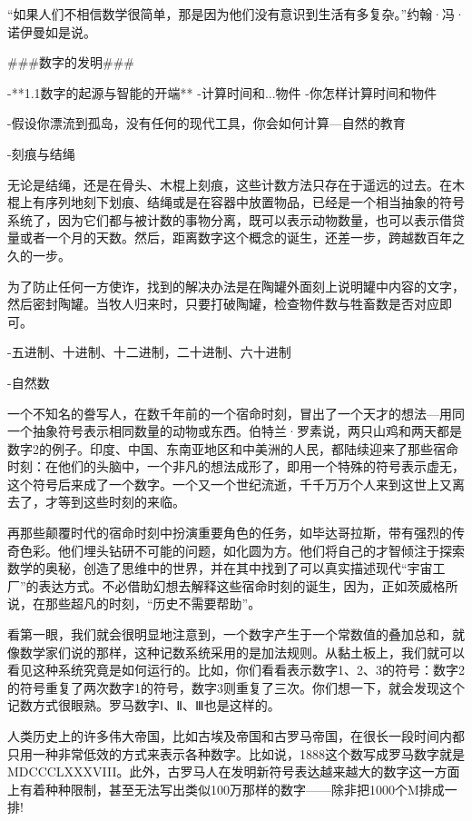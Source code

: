 “如果人们不相信数学很简单，那是因为他们没有意识到生活有多复杂。”约翰·冯·诺伊曼如是说。


###数字的发明###

-**1.1数字的起源与智能的开端**
-计算时间和...物件
-你怎样计算时间和物件

-假设你漂流到孤岛，没有任何的现代工具，你会如何计算---自然的教育

-刻痕与结绳

无论是结绳，还是在骨头、木棍上刻痕，这些计数方法只存在于遥远的过去。在木棍上有序列地刻下划痕、结绳或是在容器中放置物品，已经是一个相当抽象的符号系统了，因为它们都与被计数的事物分离，既可以表示动物数量，也可以表示借贷量或者一个月的天数。然后，距离数字这个概念的诞生，还差一步，跨越数百年之久的一步。

为了防止任何一方使诈，找到的解决办法是在陶罐外面刻上说明罐中内容的文字，然后密封陶罐。当牧人归来时，只要打破陶罐，检查物件数与牲畜数是否对应即可。


-五进制、十进制、十二进制，二十进制、六十进制


-自然数

一个不知名的誊写人，在数千年前的一个宿命时刻，冒出了一个天才的想法---用同一个抽象符号表示相同数量的动物或东西。伯特兰·罗素说，两只山鸡和两天都是数字2的例子。印度、中国、东南亚地区和中美洲的人民，都陆续迎来了那些宿命时刻：在他们的头脑中，一个非凡的想法成形了，即用一个特殊的符号表示虚无，这个符号后来成了一个数字。一个又一个世纪流逝，千千万万个人来到这世上又离去了，才等到这些时刻的来临。

再那些颠覆时代的宿命时刻中扮演重要角色的任务，如毕达哥拉斯，带有强烈的传奇色彩。他们埋头钻研不可能的问题，如化圆为方。他们将自己的才智倾注于探索数学的奥秘，创造了思维中的世界，并在其中找到了可以真实描述现代“宇宙工厂”的表达方式。不必借助幻想去解释这些宿命时刻的诞生，因为，正如茨威格所说，在那些超凡的时刻，“历史不需要帮助”。



看第一眼，我们就会很明显地注意到，一个数字产生于一个常数值的叠加总和，就像数学家们说的那样，这种记数系统采用的是加法规则。从黏土板上，我们就可以看见这种系统究竟是如何运行的。比如，你们看看表示数字1、2、3的符号：数字2的符号重复了两次数字1的符号，数字3则重复了三次。你们想一下，就会发现这个记数方式很眼熟。罗马数字Ⅰ、Ⅱ、Ⅲ也是这样的。

人类历史上的许多伟大帝国，比如古埃及帝国和古罗马帝国，在很长一段时间内都只用一种非常低效的方式来表示各种数字。比如说，1888这个数写成罗马数字就是MDCCCLXXXVIII。此外，古罗马人在发明新符号表达越来越大的数字这一方面上有着种种限制，甚至无法写出类似100万那样的数字——除非把1000个M排成一排!

